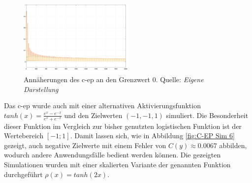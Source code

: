\begin{figure}[h]
  \centering
  \includegraphics[width=0.5\textwidth]{abbildungen/c_ep_sim_5_ausgabe.png}
  \caption{Annäherungen des \gls{c-ep} an den Grenzwert \(0\). Quelle: \textit{Eigene Darstellung}}
  \label{fig:C-EP Sim 5}
\end{figure}

Das \gls{c-ep} wurde auch mit einer alternativen Aktivierungsfunktion \(tanh(x)=\frac{e^x-e^{-x}}{e^x+e^{-x}}\) und den Zielwerten \((-1,-1,1)\) simuliert. Die Besonderheit dieser Funktion im Vergleich zur bisher genutzten logistischen Funktion ist der Wertebereich \([-1;1]\). Damit lassen sich, wie in Abbildung \ref{fig:C-EP Sim 6} gezeigt, auch negative Zielwerte mit einem Fehler von \(C(y)\approx0.0067\) abbilden, wodurch andere Anwendungsfälle bedient werden können. Die gezeigten Simulationen wurden mit einer skalierten Variante der genannten Funktion durchgeführt \(\rho(x)=tanh(2x)\).

